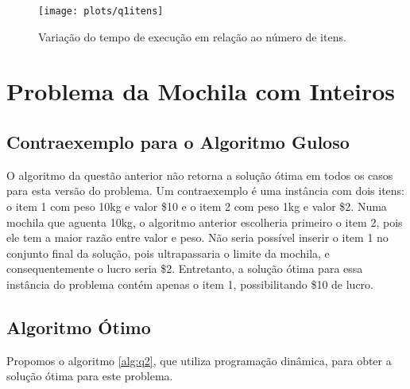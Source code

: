 \documentclass[a4paper, 11pt]{article}
\begin{document}
\begin{figure}[htb]
\centering
\texttt{[image: plots/q1itens]}
\caption{Variação do tempo de execução em relação ao número de itens.}
\label{fig:q1:itens}
\end{figure}

\section{Problema da Mochila com Inteiros}

\subsection{Contraexemplo para o Algoritmo Guloso}

O algoritmo da questão anterior não retorna a solução ótima em todos os casos para esta versão do problema. Um contraexemplo é uma instância com dois itens: o item 1 com peso 10kg e valor \$10 e o item 2 com peso 1kg e valor \$2. Numa mochila que aguenta 10kg, o algoritmo anterior escolheria primeiro o item 2, pois ele tem a maior razão entre valor e peso. Não seria possível inserir o item 1 no conjunto final da solução, pois ultrapassaria o limite da mochila, e consequentemente o lucro seria \$2. Entretanto, a solução ótima para essa instância do problema contém apenas o item 1, possibilitando \$10 de lucro.

\subsection{Algoritmo Ótimo}

Propomos o algoritmo \ref{alg:q2}, que utiliza programação dinâmica, para obter a solução ótima para este problema.
\end{document}
